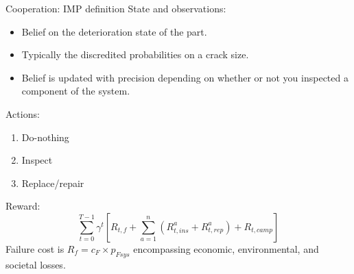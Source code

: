 \documentclass[9pt, hyperref={pdfusetitle,colorlinks=true,allcolors=DarkBlue}]{beamer}
\begin{document}


\begin{frame}{Cooperation: IMP definition}
State and observations:
\begin{itemize}
    \item Belief on the deterioration state of the part.
    \item Typically the discredited probabilities on a crack size.
    \item Belief is updated with precision depending on whether or not you inspected a component of the system. 
\end{itemize}
Actions: 
\begin{enumerate}
    \item Do-nothing
    \item Inspect
    \item Replace/repair
\end{enumerate}
Reward:
\begin{equation}
     \sum_{t=0}^{T-1} \gamma^t \left[ R_{t,f}+ \sum_{a=1}^n \left({R_{t,ins}^a} + {R_{t,rep}^a}\right)+R_{t,camp} \right]
    \label{eq:totalcost}
\end{equation}
Failure cost is $R_f = c_F \times p_{Fsys}$ encompassing economic, environmental, and societal losses.
\end{frame}
\end{document}

